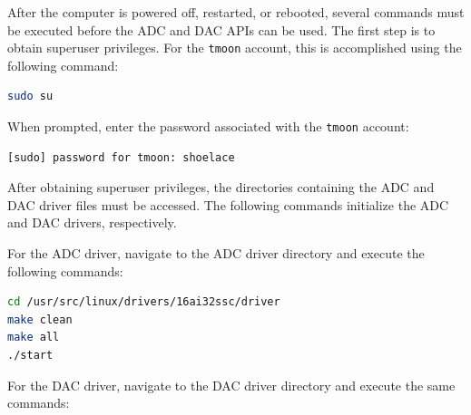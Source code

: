 %
%
%
%
%




\makeappendices
{}
\label{chap:appendix}

\label{sec:ADC_DAC_linux_commands}

After the computer is powered off, restarted, or rebooted, several commands must be executed before the ADC and DAC APIs can be used. The first step is to obtain superuser privileges. For the \texttt{tmoon} account, this is accomplished using the following command:

\begin{lstlisting}[language=bash]
sudo su
\end{lstlisting}

When prompted, enter the password associated with the \texttt{tmoon} account:

\begin{lstlisting}[language=bash]
[sudo] password for tmoon: shoelace
\end{lstlisting}

After obtaining superuser privileges, the directories containing the ADC and DAC driver files must be accessed. The following commands initialize the ADC and DAC drivers, respectively.

For the ADC driver, navigate to the ADC driver directory and execute the following commands:

\begin{lstlisting}[language=bash]
cd /usr/src/linux/drivers/16ai32ssc/driver
make clean
make all
./start
\end{lstlisting}

For the DAC driver, navigate to the DAC driver directory and execute the same commands:

